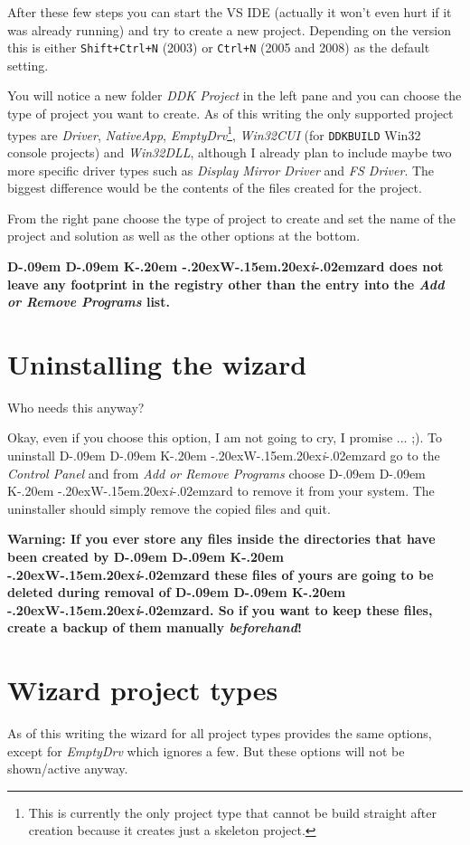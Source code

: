 \documentclass[a4paper,titlepage]{report}
\newcommand{\important}[1]{\textcolor[rgb]{0.90,0.00,0.00}{\textbf{#1}}}
\def\ddkwiz{\texorpdfstring{D\kern-.09em D\kern-.09em K\kern-.20em \raise-.20ex\hbox{W}\kern-.15em\raise.20ex\hbox{\it{i}}\kern-.02em{zard}}{DDKWizard}}
\begin{document}
After these few steps you can start the VS IDE (actually it won't even hurt if it
was already running) and try to create a new project. Depending on the version
this is either \texttt{Shift+Ctrl+N} (2003) or \texttt{Ctrl+N} (2005 and 2008)
as the default setting.

You will notice a new folder \emph{DDK Project} in the left pane and you
can choose the type of project you want to create. As of this writing the
only supported project types are \emph{Driver}, \emph{NativeApp}, \emph{EmptyDrv}\footnote{This
is currently the only project type that cannot be build straight after creation
because it creates just a skeleton project.}, \emph{Win32CUI} (for \texttt{DDKBUILD}
Win32 console projects) and \emph{Win32DLL}, although I already plan to include
maybe two more specific driver types such as \emph{Display Mirror Driver} and
\emph{FS Driver}. The biggest difference would be the contents of the files created
for the project.

From the right pane choose the type of project to create and set the name
of the project and solution as well as the other options at the bottom.

\important{\ddkwiz{} does not leave any footprint in the registry other than
the entry into the \emph{Add or Remove Programs} list.}

\section{Uninstalling the wizard}
Who needs this anyway?

Okay, even if you choose this option, I am not going to cry, I promise ... \textsf{;)}. To
uninstall \ddkwiz{} go to the \emph{Control Panel} and from \emph{Add or Remove Programs}
choose \ddkwiz{} to remove it from your system. The uninstaller should simply
remove the copied files and quit.

\important{Warning: If you ever store any files inside the directories that
have been created by \ddkwiz{} these files of yours are going to be deleted during
removal of \ddkwiz{}. So if you want to keep these files, create a backup
of them manually \emph{beforehand}!}

\section{Wizard project types}
\label{sec:projtypes}
As of this writing the wizard for all project types provides the same options,
except for \emph{EmptyDrv} which ignores a few. But these options will not
be shown/active anyway.
\end{document}

